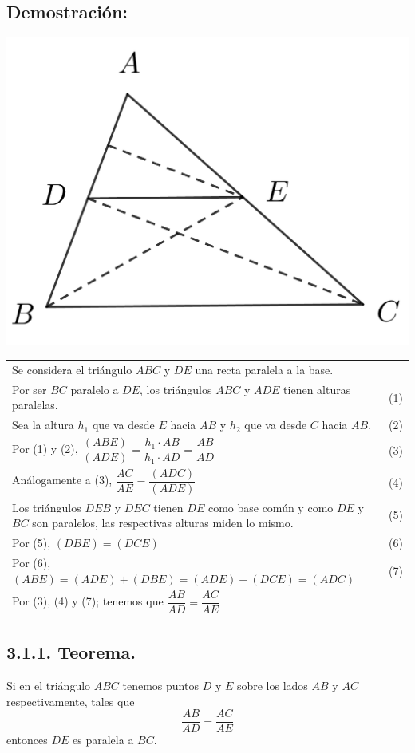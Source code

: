 \documentclass[12pt,a4paper]{article}
\begin{document}
\subsection*{Demostración:}
\begin{center}
\includegraphics[scale=0.6]{Imagenes/thales 1.png} 
\end{center}
\begin{tabular}{p{15.9cm}p{1cm}}
\\Se considera el triángulo $ABC$ y $DE$ una recta paralela a la base.
\\Por ser $BC$ paralelo a $DE$, los triángulos $ABC$ y $ADE$ tienen alturas paralelas. &(1)
\\Sea la altura $h_1$ que va desde $E$ hacia $AB$ y $h_2$ que va desde $C$ hacia $AB$. &(2)
\\Por (1) y (2), $\dfrac{(ABE)}{(ADE)}=\dfrac{h_1 \cdot AB }{h_1 \cdot AD}=\dfrac{AB}{AD}$ &(3)
\\Análogamente a (3), $\dfrac{AC}{AE}=\dfrac{(ADC)}{(ADE)}$ &(4)
\\Los triángulos $DEB$ y $DEC$ tienen  $DE$ como base común y como $DE$ y $BC$ son paralelos, las respectivas alturas miden lo mismo. &\medskip(5)
\\Por (5), $(DBE)= (DCE)$& (6)
\\Por (6), $(ABE)=(ADE)+(DBE)=(ADE)+ (DCE)= (ADC)$ & (7)
\\Por (3), (4) y (7); tenemos que $\dfrac{AB}{AD}=\dfrac{AC}{AE}$
\end{tabular}
\subsection*{3.1.1. Teorema.}
 Si en el triángulo $ABC$ tenemos puntos $D$ y $E$ sobre los lados $AB$ y $AC$ respectivamente, tales que $$\dfrac{AB}{AD}=\dfrac{AC}{AE}$$
entonces $DE$ es paralela a $BC$.
\end{document}
